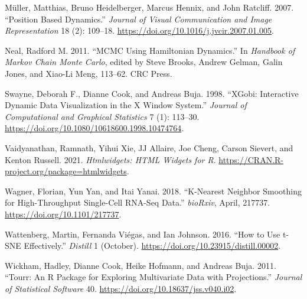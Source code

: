 \begin{CSLReferences}{1}{0}
\leavevmode{}%
Müller, Matthias, Bruno Heidelberger, Marcus Hennix, and John Ratcliff. 2007. {``Position Based Dynamics.''} \emph{Journal of Visual Communication and Image Representation} 18 (2): 109--18. \url{https://doi.org/10.1016/j.jvcir.2007.01.005}.

\leavevmode{}%
Neal, Radford M. 2011. {``{MCMC} Using {Hamiltonian Dynamics}.''} In \emph{Handbook of {Markov Chain Monte Carlo}}, edited by Steve Brooks, Andrew Gelman, Galin Jones, and Xiao-Li Meng, 113--62. CRC Press.

\leavevmode{}%
Swayne, Deborah F., Dianne Cook, and Andreas Buja. 1998. {``{XGobi}: Interactive Dynamic Data Visualization in the {X Window System}.''} \emph{Journal of Computational and Graphical Statistics} 7 (1): 113--30. \url{https://doi.org/10.1080/10618600.1998.10474764}.

\leavevmode{}%
Vaidyanathan, Ramnath, Yihui Xie, JJ Allaire, Joe Cheng, Carson Sievert, and Kenton Russell. 2021. \emph{Htmlwidgets: {HTML} Widgets for {R}}. \url{https://CRAN.R-project.org/package=htmlwidgets}.

\leavevmode{}%
Wagner, Florian, Yun Yan, and Itai Yanai. 2018. {``K-Nearest Neighbor Smoothing for High-Throughput Single-Cell {RNA-Seq} Data.''} \emph{bioRxiv}, April, 217737. \url{https://doi.org/10.1101/217737}.

\leavevmode{}%
Wattenberg, Martin, Fernanda Viégas, and Ian Johnson. 2016. {``How to Use {t-SNE} Effectively.''} \emph{Distill} 1 (October). \url{https://doi.org/10.23915/distill.00002}.

\leavevmode{}%
Wickham, Hadley, Dianne Cook, Heike Hofmann, and Andreas Buja. 2011. {``Tourr: An {R} Package for Exploring Multivariate Data with Projections.''} \emph{Journal of Statistical Software} 40. \url{https://doi.org/10.18637/jss.v040.i02}.

\end{CSLReferences}


\address{%
Paul Harrison\\
Monash Genomics and Bioinformatics Platform, Monash University\\%
15 Innovation Walk\\ Monash University, Clayton Campus\\ Clayton VIC, Australia, 3800\\
%
\url{https://logarithmic.net/pfh/}\\%
\textit{ORCiD: \href{https://orcid.org/0000-0002-3980-268X}{0000-0002-3980-268X}}\\%
\href{mailto:paul.harrison@monash.edu}{\nolinkurl{paul.harrison@monash.edu}}%
}
